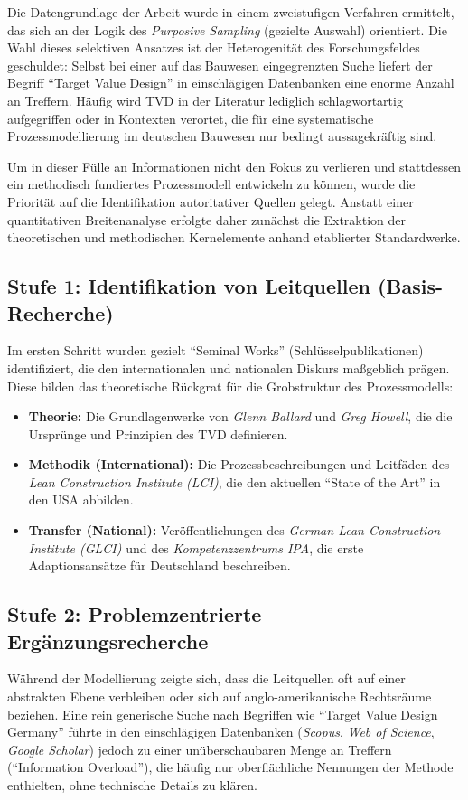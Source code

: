 Die Datengrundlage der Arbeit wurde in einem zweistufigen Verfahren ermittelt, das sich an der Logik des \textit{Purposive Sampling} (gezielte Auswahl) orientiert.
Die Wahl dieses selektiven Ansatzes ist der Heterogenität des Forschungsfeldes geschuldet: Selbst bei einer auf das Bauwesen eingegrenzten Suche liefert der Begriff \enquote{Target Value Design} in einschlägigen Datenbanken eine enorme Anzahl an Treffern. Häufig wird \acs{TVD} in der Literatur lediglich schlagwortartig aufgegriffen oder in Kontexten verortet, die für eine systematische Prozessmodellierung im deutschen Bauwesen nur bedingt aussagekräftig sind.

Um in dieser Fülle an Informationen nicht den Fokus zu verlieren und stattdessen ein methodisch fundiertes Prozessmodell entwickeln zu können, wurde die Priorität auf die Identifikation autoritativer Quellen gelegt. Anstatt einer quantitativen Breitenanalyse erfolgte daher zunächst die Extraktion der theoretischen und methodischen Kernelemente anhand etablierter Standardwerke.

\subsection{Stufe 1: Identifikation von Leitquellen (Basis-Recherche)}
Im ersten Schritt wurden gezielt \enquote{Seminal Works} (Schlüsselpublikationen) identifiziert, die den internationalen und nationalen Diskurs maßgeblich prägen. Diese bilden das theoretische Rückgrat für die Grobstruktur des Prozessmodells:
\begin{itemize}
    \item \textbf{Theorie:} Die Grundlagenwerke von \textit{Glenn Ballard} und \textit{Greg Howell}, die die Ursprünge und Prinzipien des \acs{TVD} definieren.
    \item \textbf{Methodik (International):} Die Prozessbeschreibungen und Leitfäden des \textit{Lean Construction Institute (\acs{LCI})}, die den aktuellen \enquote{State of the Art} in den USA abbilden.
    \item \textbf{Transfer (National):} Veröffentlichungen des \textit{German Lean Construction Institute (\acs{GLCI})} und des \textit{Kompetenzzentrums \acs{IPA}}, die erste Adaptionsansätze für Deutschland beschreiben.
\end{itemize}

\subsection{Stufe 2: Problemzentrierte Ergänzungsrecherche}
Während der Modellierung zeigte sich, dass die Leitquellen oft auf einer abstrakten Ebene verbleiben oder sich auf anglo-amerikanische Rechtsräume beziehen. Eine rein generische Suche nach Begriffen wie \enquote{Target Value Design Germany} führte in den einschlägigen Datenbanken (\textit{Scopus}, \textit{Web of Science}, \textit{Google Scholar}) jedoch zu einer unüberschaubaren Menge an Treffern (\enquote{Information Overload}), die häufig nur oberflächliche Nennungen der Methode enthielten, ohne technische Details zu klären.

